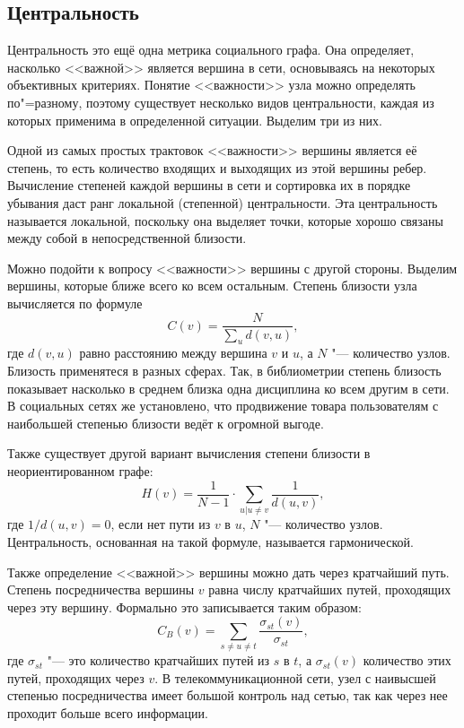 \subsection{Центральность}
Центральность это ещё одна метрика социального графа. Она определяет, насколько  <<важной>> является вершина в сети, основываясь на некоторых объективных критериях\cite{hansen2010analyzing}. Понятие <<важности>> узла можно определять по"=разному, поэтому существует несколько видов центральности, каждая из которых применима в определенной ситуации. Выделим три из них.

Одной из самых простых трактовок <<важности>> вершины является её степень, то есть количество входящих и выходящих из этой вершины ребер. Вычисление степеней каждой вершины в сети и сортировка их в порядке убывания даст ранг локальной (степенной) центральности. Эта центральность называется локальной, поскольку она выделяет точки, которые хорошо связаны между собой в непосредственной близости\cite{scott2012social}.

Можно подойти к вопросу <<важности>> вершины с другой стороны. Выделим вершины, которые ближе всего ко всем остальным. Степень близости узла вычисляется по формуле
\begin{equation*}
    C(v) = \frac{N}{\sum_u{d(v,u)}},
\end{equation*}
где $d(v,u)$ равно расстоянию между вершина $v$ и $u$, а $N$ "--- количество узлов. Близость применятеся в разных сферах. Так, в библиометрии степень близость показывает насколько в среднем близка одна дисциплина ко всем другим в сети\cite{bibliometrics}. В социальных сетях же установлено, что продвижение товара пользователям с наибольшей степенью близости ведёт к огромной выгоде\cite{closeness_marketing}.

Также существует другой вариант вычисления степени близости в неориентированном графе:
\begin{equation*}
    H(v) = \frac{1}{N - 1} \cdot  \sum_{u\vert u \neq v}{\frac{1}{d(u,v)}},
\end{equation*}
где $1/d(u,v) = 0$, если нет пути из $v$ в $u$, $N$ "--- количество узлов. Центральность, основанная на такой формуле, называется гармонической.

Также определение <<важной>> вершины можно дать через кратчайший путь. Степень посредничества вершины $v$ равна числу кратчайших путей, проходящих через эту вершину. Формально это записывается таким образом:
\begin{equation*}
    C_B(v) = \sum_{s \neq u \neq t }{\frac{\sigma_{st}(v) }{\sigma_{st}}},
\end{equation*}
где $\sigma_{st}$ "--- это количество кратчайших путей из $s$ в $t$, а $\sigma_{st}(v)$ количество этих путей, проходящих через $v$. В телекоммуникационной сети, узел с наивысшей степенью посредничества имеет большой контроль над сетью, так как через нее проходит больше всего информации.

